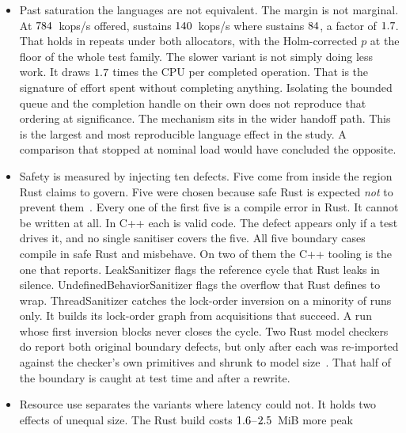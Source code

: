 \documentclass[english,twoside,openright,a4paper,censored,csm,software-track-2020]{HYthesisML}
\begin{document}
\begin{itemize}
        \BudgetCoreFaster{}. The likely cause is the standard hash map's layout, not anything
        about safety.
  \item Past saturation the languages are not equivalent. The margin is not marginal. At
        $784$~kops/s offered, \OverloadSustainedFaster{} sustains
        $140$~kops/s where \OverloadSustainedSlower{} sustains
        $84$, a factor of $1.7$. That holds in \OverloadThrAgree{}
        repeats under both allocators, with the Holm-corrected $p$ at the floor of the whole
        test family. The slower variant is not simply doing less work. It draws
        $1.7$ times the CPU per completed operation. That is the signature of
        effort spent without completing anything. Isolating the bounded queue and the completion
        handle on their own does not reproduce that ordering at significance. The mechanism sits
        in the wider handoff path. This is the largest and most reproducible language effect in
        the study. A comparison that stopped at nominal load would have concluded the opposite.
  \item Safety is measured by injecting ten defects. Five come from inside the region Rust
        claims to govern. Five were chosen because safe Rust is expected \emph{not} to prevent
        them~\cite{natella2016fault}. Every one of the first five is a compile error in Rust. It
        cannot be written at all. In C++ each is valid code. The defect appears only if a test
        drives it, and no single sanitiser covers the five. All five boundary cases compile in
        safe Rust and misbehave. On two of them the C++ tooling is the one that reports.
        LeakSanitizer flags the reference cycle that Rust leaks in silence.
        UndefinedBehaviorSanitizer flags the overflow that Rust defines to wrap. ThreadSanitizer
        catches the lock-order inversion on a minority of runs only. It builds its lock-order
        graph from acquisitions that succeed. A run whose first inversion blocks never closes the
        cycle. Two Rust model checkers do report both original boundary defects, but only after
        each was re-imported against the checker's own primitives and shrunk to model
        size~\cite{bornholt2021shardstore}. That half of the boundary is caught at test time and
        after a rewrite.
  \item Resource use separates the variants where latency could not. It holds two effects of
        unequal size. The Rust build costs $1.6$--$2.5$~MiB more peak

\end{itemize}
\end{document}
